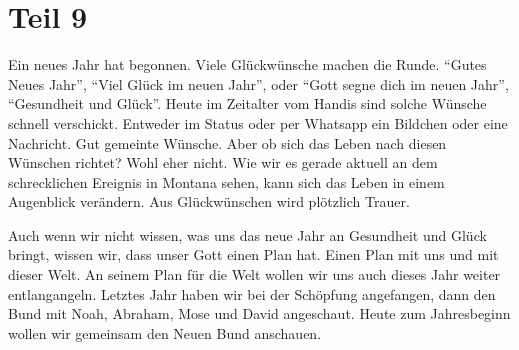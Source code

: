 \section{Teil 9}
\begin{otsblock}[Einführung]
    Ein neues Jahr hat begonnen. Viele Glückwünsche machen die Runde. \enquote{Gutes Neues Jahr}, \enquote{Viel Glück im neuen Jahr}, oder \enquote{Gott segne dich im neuen Jahr}, \enquote{Gesundheit und Glück}. Heute im Zeitalter vom Handis sind solche Wünsche schnell verschickt. Entweder im Status oder per Whatsapp ein Bildchen oder eine Nachricht. Gut gemeinte Wünsche. Aber ob sich das Leben nach diesen Wünschen richtet? Wohl eher nicht. Wie wir es gerade aktuell an dem schrecklichen Ereignis in Montana sehen, kann sich das Leben in einem Augenblick verändern. Aus Glückwünschen wird plötzlich Trauer.

    Auch wenn wir nicht wissen, was uns das neue Jahr an Gesundheit und Glück bringt, wissen wir, dass unser Gott einen Plan hat. Einen Plan mit uns und mit dieser Welt. An seinem Plan für die Welt wollen wir uns auch dieses Jahr weiter entlangangeln. Letztes Jahr haben wir bei der Schöpfung angefangen, dann den Bund mit Noah, Abraham, Mose und David angeschaut. Heute zum Jahresbeginn wollen wir gemeinsam den Neuen Bund anschauen.


\end{otsblock}
